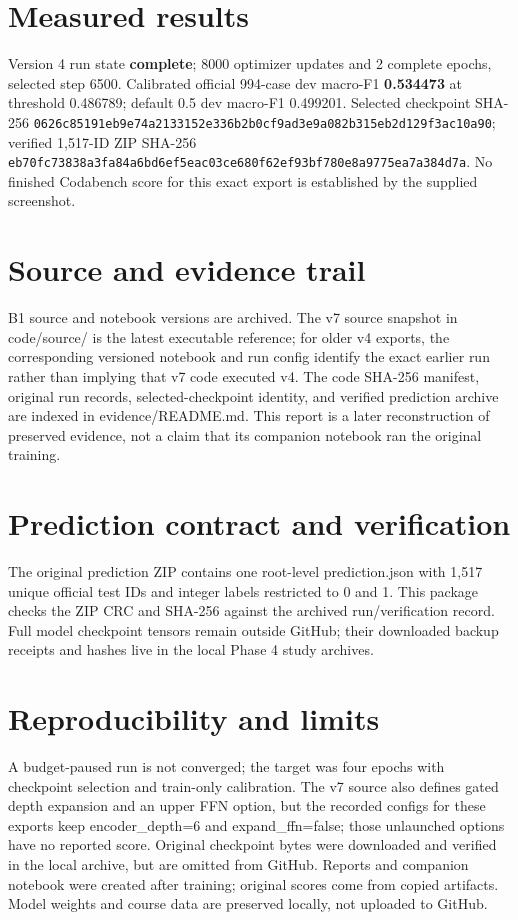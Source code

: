 \documentclass[11pt,a4paper]{article}
\begin{document}
\section{Measured results}
Version 4 run state \textbf{complete}; 8000 optimizer updates and 2 complete epochs, selected step 6500. Calibrated official 994-case dev macro-F1 \textbf{0.534473} at threshold 0.486789; default 0.5 dev macro-F1 0.499201. Selected checkpoint SHA-256 \texttt{0626c85191eb9e74a2133152e336b2b0cf9ad3e9a082b315eb2d129f3ac10a90}; verified 1,517-ID ZIP SHA-256 \texttt{eb70fc73838a3fa84a6bd6ef5eac03ce680f62ef93bf780e8a9775ea7a384d7a}. No finished Codabench score for this exact export is established by the supplied screenshot.
\section{Source and evidence trail}
B1 source and notebook versions are archived. The v7 source snapshot in code/source/ is the latest executable reference; for older v4 exports, the corresponding versioned notebook and run config identify the exact earlier run rather than implying that v7 code executed v4. The code SHA-256 manifest, original run records, selected-checkpoint identity, and verified prediction archive are indexed in evidence/README.md. This report is a later reconstruction of preserved evidence, not a claim that its companion notebook ran the original training.
\section{Prediction contract and verification}
The original prediction ZIP contains one root-level prediction.json with 1,517 unique official test IDs and integer labels restricted to 0 and 1. This package checks the ZIP CRC and SHA-256 against the archived run/verification record. Full model checkpoint tensors remain outside GitHub; their downloaded backup receipts and hashes live in the local Phase 4 study archives.
\section{Reproducibility and limits}
A budget-paused run is not converged; the target was four epochs with checkpoint selection and train-only calibration. The v7 source also defines gated depth expansion and an upper FFN option, but the recorded configs for these exports keep encoder\_depth=6 and expand\_ffn=false; those unlaunched options have no reported score. Original checkpoint bytes were downloaded and verified in the local archive, but are omitted from GitHub. Reports and companion notebook were created after training; original scores come from copied artifacts. Model weights and course data are preserved locally, not uploaded to GitHub.
\end{document}
